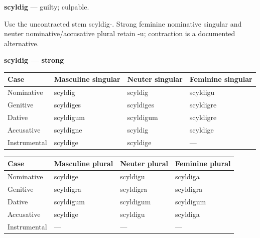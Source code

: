 \par\begin{minipage}{\linewidth}\raggedright
\textbf{scyldig} — guilty; culpable.

Use the uncontracted stem scyldig-. Strong feminine nominative singular and neuter nominative/\allowbreak{}accusative plural retain -u; contraction is a documented alternative.

\textbf{scyldig — strong}

\par\begingroup
\fontsize{10.5}{13.2}\selectfont
\setlength{\LTleft}{0pt}\setlength{\LTright}{\fill}
\noindent
\begin{tabular}{@{}>{\raggedright\arraybackslash}p{22.0mm}>{\raggedright\arraybackslash}p{31.188mm}>{\raggedright\arraybackslash}p{31.188mm}>{\raggedright\arraybackslash}p{31.188mm}@{}}
\toprule
\textbf{Case} & \textbf{Masculine singular} & \textbf{Neuter singular} & \textbf{Feminine singular} \\
\midrule
Nominative & scyldig & scyldig & scyldigu \\
Genitive & scyldiges & scyldiges & scyldigre \\
Dative & scyldigum & scyldigum & scyldigre \\
Accusative & scyldigne & scyldig & scyldige \\
Instrumental & scyldige & scyldige & — \\
\bottomrule
\end{tabular}
\par\endgroup
\end{minipage}\par
\par\addvspace{5pt}
\par\begingroup
\fontsize{10.5}{13.2}\selectfont
\setlength{\LTleft}{0pt}\setlength{\LTright}{\fill}
\noindent
\begin{tabular}{@{}>{\raggedright\arraybackslash}p{22.0mm}>{\raggedright\arraybackslash}p{31.188mm}>{\raggedright\arraybackslash}p{31.188mm}>{\raggedright\arraybackslash}p{31.188mm}@{}}
\toprule
\textbf{Case} & \textbf{Masculine plural} & \textbf{Neuter plural} & \textbf{Feminine plural} \\
\midrule
Nominative & scyldige & scyldigu & scyldiga \\
Genitive & scyldigra & scyldigra & scyldigra \\
Dative & scyldigum & scyldigum & scyldigum \\
Accusative & scyldige & scyldigu & scyldiga \\
Instrumental & — & — & — \\
\bottomrule
\end{tabular}
\par\endgroup


